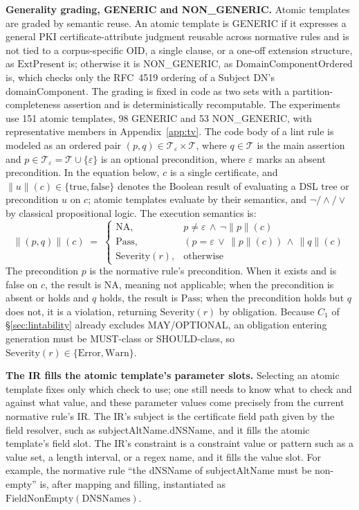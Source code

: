 \textbf{Generality grading, GENERIC and NON\_GENERIC.} Atomic templates are
graded by semantic reuse. An atomic template is GENERIC if it expresses a
general PKI certificate-attribute judgment reusable across normative rules and
is not tied to a corpus-specific OID, a single clause, or a one-off extension
structure, as $\mathrm{ExtPresent}$ is; otherwise it is NON\_GENERIC, as
$\mathrm{DomainComponentOrdered}$ is, which checks only the RFC~4519 ordering of
a Subject DN's domainComponent. The grading is fixed in code as two sets with a
partition-completeness assertion and is deterministically recomputable. The
experiments use 151 atomic templates, 98 GENERIC and 53 NON\_GENERIC, with
representative members in Appendix~\ref{app:tv}. The code body of a lint rule is modeled as
an ordered pair $(p, q) \in \mathcal{T}_\varepsilon \times \mathcal{T}$, where
$q \in \mathcal{T}$ is the main assertion and $p \in \mathcal{T}_\varepsilon =
\mathcal{T} \cup \{\varepsilon\}$ is an optional precondition, where $\varepsilon$
marks an absent precondition. In the
equation below, $c$ is a single certificate, and $\lVert u \rVert(c) \in
\{\mathrm{true}, \mathrm{false}\}$ denotes the Boolean result of evaluating a
DSL tree or precondition $u$ on $c$; atomic templates evaluate by their semantics, and
$\neg/\wedge/\vee$ by classical propositional logic. The execution semantics
is:
\begin{equation}\label{eq:exec}
  \lVert (p, q) \rVert(c) \;=\;
  \begin{cases}
    \mathrm{NA}, & p \neq \varepsilon \,\land\, \lnot\lVert p \rVert(c) \\[2pt]
    \mathrm{Pass}, & (p = \varepsilon \,\lor\, \lVert p \rVert(c)) \,\land\,
      \lVert q \rVert(c) \\[2pt]
    \mathrm{Severity}(r), & \text{otherwise}
  \end{cases}
\end{equation}
The precondition $p$ is the normative rule's precondition. When it exists and is
false on $c$, the result is $\mathrm{NA}$, meaning not applicable; when the
precondition is absent or holds and $q$ holds, the result is $\mathrm{Pass}$;
when the precondition holds but $q$ does not, it is a violation, returning
$\mathrm{Severity}(r)$ by obligation. Because $C_1$ of \S\ref{sec:lintability}
already excludes MAY/OPTIONAL, an obligation entering generation must be
MUST-class or SHOULD-class, so $\mathrm{Severity}(r) \in \{\mathrm{Error},
\mathrm{Warn}\}$.

\textbf{The IR fills the atomic template's parameter slots.} Selecting an atomic
template fixes only which check to use; one still needs to know what to check and
against what value, and these parameter values come precisely from the current
normative rule's IR. The IR's subject is the certificate field path given by the
field resolver, such as subjectAltName.dNSName, and it fills the atomic
template's field slot. The IR's constraint is a constraint value or
pattern such as a value set, a length interval, or a regex name, and it fills the value
slot. For example, the normative rule ``the dNSName of subjectAltName must be non-empty''
is, after mapping and filling, instantiated as
$\mathrm{FieldNonEmpty}(\mathrm{DNSNames})$.


